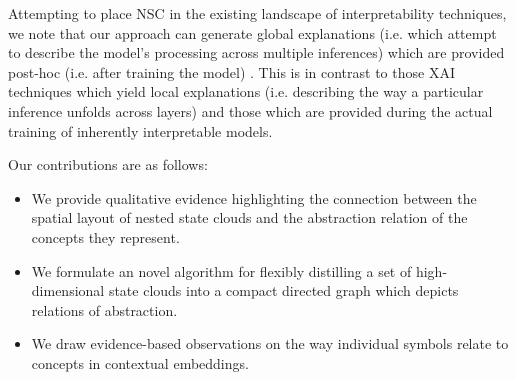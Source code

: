 Attempting to place NSC in the existing landscape of interpretability techniques, we note that our approach can generate global explanations (i.e. which attempt to describe the model's processing across multiple inferences) which are provided post-hoc (i.e. after training the model) \citep{danilevsky_survey_nodate}. This is in contrast to those XAI techniques which yield local explanations (i.e. describing the way a particular inference unfolds across layers) and those which are provided during the actual training of inherently interpretable models.

Our contributions are as follows:

\begin{itemize}
    \item We provide qualitative evidence highlighting the connection between the spatial layout of nested state clouds and the abstraction relation of the concepts they represent.
    \item We formulate an novel algorithm for flexibly distilling a set of high-dimensional state clouds into a compact directed graph which depicts relations of abstraction.
    \item We draw evidence-based observations on the way individual symbols relate to concepts in contextual embeddings.
\end{itemize}